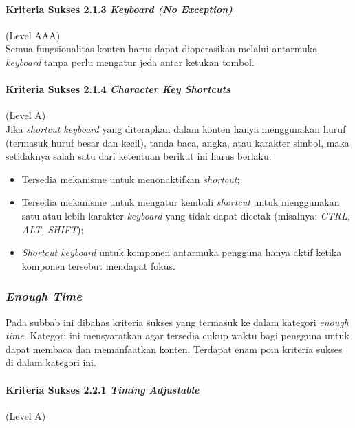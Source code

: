 \paragraph{Kriteria Sukses 2.1.3 \textit{Keyboard (No Exception)}}
\label{sec:kriteria_sukses_2.1.3}
(Level AAA)\\

Semua fungsionalitas konten harus dapat dioperasikan melalui antarmuka \textit{keyboard} tanpa perlu mengatur jeda antar ketukan tombol.

\paragraph{Kriteria Sukses 2.1.4 \textit{Character Key Shortcuts}}
\label{sec:kriteria_sukses_2.1.4}
(Level A)\\

Jika \textit{shortcut keyboard} yang diterapkan dalam konten hanya menggunakan huruf (termasuk huruf besar dan kecil), tanda baca, angka, atau karakter simbol, maka setidaknya salah satu dari ketentuan berikut ini harus berlaku:
\begin{itemize}
	\item Tersedia mekanisme untuk menonaktifkan \textit{shortcut};
	\item Tersedia mekanisme untuk mengatur kembali \textit{shortcut} untuk menggunakan satu atau lebih karakter \textit{keyboard} yang tidak dapat dicetak (misalnya: \textit{CTRL, ALT, SHIFT});
	\item \textit{Shortcut keyboard} untuk komponen antarmuka pengguna hanya aktif ketika komponen tersebut mendapat fokus.
\end{itemize}

\subsubsection{\textit{Enough Time}}
\label{sec:enough_time}
Pada subbab ini dibahas kriteria sukses yang termasuk ke dalam kategori \textit{enough time}. Kategori ini mensyaratkan agar tersedia cukup waktu bagi pengguna untuk dapat membaca dan memanfaatkan konten. Terdapat enam poin kriteria sukses di dalam kategori ini.

\paragraph{Kriteria Sukses 2.2.1 \textit{Timing Adjustable}}
\label{sec:kriteria_sukses_2.2.1}
(Level A)\\

